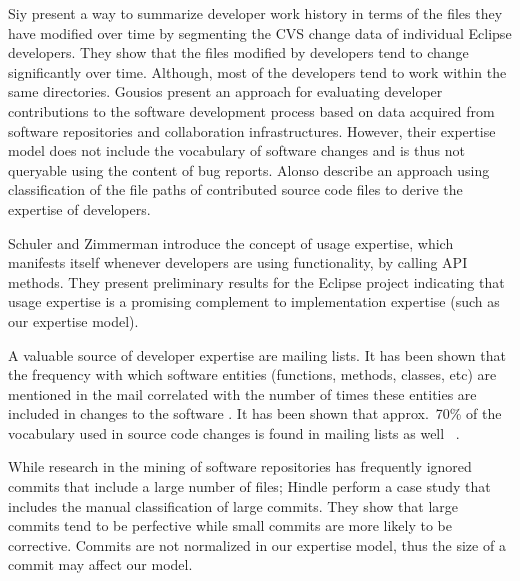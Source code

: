 Siy \etal \cite{Siy08a} present a way to summarize developer work history in terms of the files they have modified over time by segmenting the CVS change data of individual Eclipse developers. They show that the files modified by developers tend to change significantly over time. Although, most of the developers tend to work within the same directories. 
%
Gousios \etal \cite{Gous08a} present an approach for evaluating developer contributions to the software development process based on data acquired from software repositories and collaboration infrastructures. However, their expertise model does not include the vocabulary of software changes and is thus not queryable using the content of bug reports.
%
Alonso \etal \cite{Alon08a} describe an approach using classification of the file paths of contributed source code files to derive the expertise of developers. 

Schuler and Zimmerman \cite{Schu08a} introduce the concept of usage expertise, which manifests itself whenever developers are using functionality, \eg by calling API methods. They present preliminary
results for the Eclipse project indicating that usage expertise is a promising complement to implementation expertise (such as our expertise model). 


A valuable source of developer expertise are mailing lists. It has been shown that the frequency with which software entities (functions, methods, classes, etc) are mentioned in the mail correlated with the number of times these entities are included in changes to the software \cite{Patt08a}. It has been shown that approx.\ 70\% of the vocabulary used in source code changes is found in mailing lists as well~ \cite{Bays07a}.


 While research in the mining of software repositories has frequently ignored commits that include a large number of files; 
Hindle \etal \cite{Hind08b} perform a case study that includes the manual classification of large commits. They show that large commits tend to be perfective while small commits are more likely to be corrective. Commits are not normalized in our expertise model, thus the size of a commit may affect our model. 

